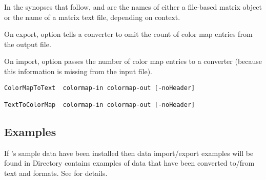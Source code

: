 In the synopses that follow,  and
 are the names of either a \sr{} file-based
matrix object or the name of a matrix text file, depending on context.

On export, option  tells a converter to omit the
count of color map entries from the output file.

On import, option  passes the number of color map entries
to a converter (because this information is missing from
the input file).

\begin{verbatim}
ColorMapToText  colormap-in colormap-out [-noHeader]

TextToColorMap  colormap-in colormap-out [-noHeader]
\end{verbatim}

\subsection{Examples}
\label{sec:converter_ex}

If \sr{}'s sample data have been installed then data import/export
examples will be found in 
Directory  contains examples of
data that have been converted to/from text and \sr{} formats.  See
 for details.

